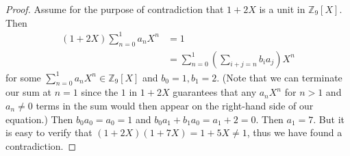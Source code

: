 \documentclass{abrice}
\newcommand{\Z}{\mathbb{Z}}
\begin{document}
\begin{proof}
  Assume for the purpose of contradiction that $1 + 2X$ is a unit in $\Z_9[X]$.
  Then
  \begin{align*}
    (1 + 2X) \sum_{n=0}^{1} a_n X^n
    &= 1 \\
    &= \sum_{n=0}^{1} \left( \sum_{i+j=n} b_i a_j \right) X^n
  \end{align*}
  for some $\sum_{n=0}^1 a_n X^n \in \Z_9[X]$ and $b_0 = 1, b_1 = 2$. (Note that
  we can terminate our sum at $n = 1$ since the $1$ in $1 + 2X$ guarantees that
  any $a_n X^n$ for $n > 1$ and $a_n \neq 0$ terms in the sum would then appear
  on the right-hand side of our equation.) Then $b_0 a_0 = a_0 = 1$ and $b_0 a_1
  + b_1 a_0 = a_1 + 2 = 0$. Then $a_1 = 7$. But it is easy to verify that $(1 +
  2X) (1 + 7X) = 1 + 5X \neq 1$, thus we have found a contradiction.
\end{proof}
\end{document}
